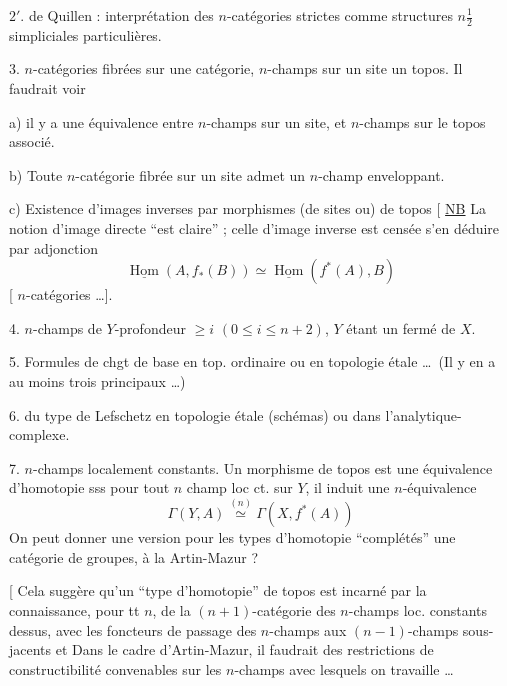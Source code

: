 $2'$.  de Quillen : interprétation des $n$-catégories
strictes comme structures $n$$\frac12$ simpliciales particulières.

3. $n$-catégories fibrées sur une catégorie, $n$-champs sur
un site un topos.  Il faudrait voir

a) il y a une équivalence entre $n$-champs sur un
site, et $n$-champs sur le topos associé.

b) Toute $n$-catégorie fibrée sur un site admet un
$n$-champ enveloppant.

c) Existence d'images inverses  par morphismes
(de sites ou) de topos [ \uline{NB} La notion d'image directe
``est claire'' ; celle d'image inverse est censée s'en
déduire par  adjonction
\[
\underline{\operatorname{Hom}}(A,f_*(B))\simeq\underline{\operatorname{Hom}}(f^*(A),B)
\]
[  $n$-catégories \ldots].


4.  $n$-champs  de $Y$-profondeur $\geq i$ \quad $(0\leq i\leq n+2)$, $Y$
étant un fermé de $X$.

5. Formules de chgt de base en top. ordinaire 
ou en topologie étale \ldots\ (Il y en a au moins trois  
principaux \ldots)

6.   du type de Lefschetz  en topologie
étale (schémas) ou dans l'analytique-complexe.

7. $n$-champs localement constants.
Un morphisme de topos  est une équivalence d'homotopie
sss pour tout $n$ champ loc ct.  sur $Y$,
il induit une $n$-équivalence
\[
\Gamma(Y,A)\mathrel{\overset{(n)}{\simeq}}\Gamma(X,f^*(A))
\]
On peut donner une version pour les types
d'homotopie ``complétés''  une catégorie de groupes,
à la Artin-Mazur ?

 [ Cela suggère qu'un ``type d'homotopie'' de topos
est incarné par la connaissance, pour tt $n$,
de la $(n+1)$-catégorie des $n$-champs loc. constants
dessus, avec les foncteurs de passage des  $n$-champs aux $(n-1)$-champs sous-jacents et 
Dans le cadre d'Artin-Mazur, il faudrait des
restrictions de constructibilité convenables sur les
$n$-champs avec lesquels on travaille \ldots

